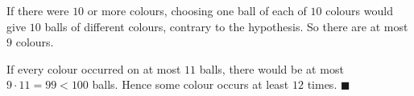 If there were $10$ or more colours, choosing one ball of each of $10$ colours would give $10$ balls of different colours, contrary to the hypothesis. So there are at most $9$ colours.

If every colour occurred on at most $11$ balls, there would be at most $9\cdot11=99<100$ balls. Hence some colour occurs at least $12$ times. $\blacksquare$
